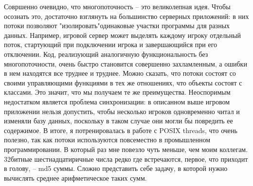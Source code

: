 \documentclass[12pt]{article}
\begin{document}
Совршенно очевидно, что многопоточность -- это великолепная идея. Чтобы осознать
это, достаточно взглянуть на большинство серверных приложений: в них потоки позволяют "изолировать"одинаковые участки программы для разных данных. Например, игровой сервер может выделять каждому игроку отдельный поток, стартующий
при подключении игрока и завершающийся при его отключении. Код, реализующий
аналогичную функциональность без многопоточности, очень быстро становится совершенно захламленным, а ошибки в нем находятся все труднее и труднее. Можно
сказать, что потоки состоят со своими управляющими функциями в тех же отношениях, что объекты состоят с классами. Это значит, что мы получаем те же преимущества.
Неоспоримым недостатком является проблема синхронизации: в описанном выше игровом приложении нельзя допустить, чтобы несколько игроков одновременно читал
и изменяли базу данных, поскольку в таком случае они могли бы повредить ее содержимое.
В итоге, я потренировалась в работе с POSIX threads, что очень полезно, так как
потоки используются повсеместно в промышленном программировании. В который
раз мне повезло чуть меньше, чем моим коллегам. 32битные шестнадцатиричные
числа редко где встречаются, первое, что приходит в голову, – md5 суммы. Сложно
представить себе задачу, в которой нужно вычислять среднее арифметическое таких
сумм.
\end{document}
